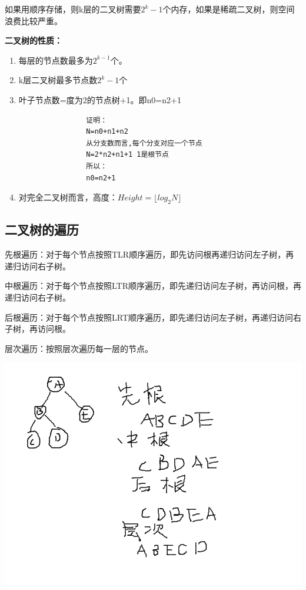 \documentclass{article}
\begin{document}
	如果用顺序存储，则k层的二叉树需要$2^{k}-1$个内存，如果是稀疏二叉树，则空间浪费比较严重。

	\textbf{二叉树的性质：}
	\begin{enumerate}
		\item 每层的节点数最多为$2^{k-1}$个。
		\item k层二叉树最多节点数$2^{k}-1$个
		\item 叶子节点数=度为2的节点树+1。即n0=n2+1
			\begin{verbatim}
				证明：
				N=n0+n1+n2
				从分支数而言,每个分支对应一个节点
				N=2*n2+n1+1 1是根节点
				所以：
				n0=n2+1
			\end{verbatim}
		\item 对完全二叉树而言，高度：$Height=\lfloor log_2N \rfloor $
	\end{enumerate}
	\subsection{二叉树的遍历}
		先根遍历：对于每个节点按照TLR顺序遍历，即先访问根再递归访问左子树，再递归访问右子树。

		中根遍历：对于每个节点按照LTR顺序遍历，即先递归访问左子树，再访问根，再递归访问右子树。

		后根遍历：对于每个节点按照LRT顺序遍历，即先递归访问左子树，再递归访问右子树，再访问根。

		层次遍历：按照层次遍历每一层的节点。

		\includegraphics[scale=0.4]{./pic/tree-04.png}
\end{document}
